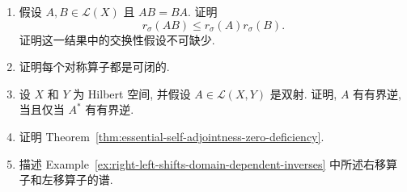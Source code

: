 \begin{enumerate}[label=\thesection.\arabic*.,ref=\thesection.\arabic*,start=24,series=book-problems]
\item\label{ex:commuting-operator-product-spectral-radius} 假设 $A,B\in\mathcal{L}(X)$ 且 $AB=BA$. 证明\[r_\sigma(AB)\leq r_\sigma(A)r_\sigma(B).\]证明这一结果中的交换性假设不可缺少.

\item\label{ex:symmetric-operator-closable} 证明每个对称算子都是可闭的.

\item\label{ex:hilbert-adjoint-bounded-inverse-equivalence} 设 $X$ 和 $Y$ 为 Hilbert 空间, 并假设 $A\in\mathcal{L}(X,Y)$ 是双射. 证明, $A$ 有有界逆, 当且仅当 $A^*$ 有有界逆.

\item\label{ex:essential-self-adjointness-deficiency-proof} 证明 Theorem~\ref{thm:essential-self-adjointness-zero-deficiency}.

\item\label{ex:right-left-shift-spectra} 描述 Example~\ref{ex:right-left-shifts-domain-dependent-inverses} 中所述右移算子和左移算子的谱.

\end{enumerate}
